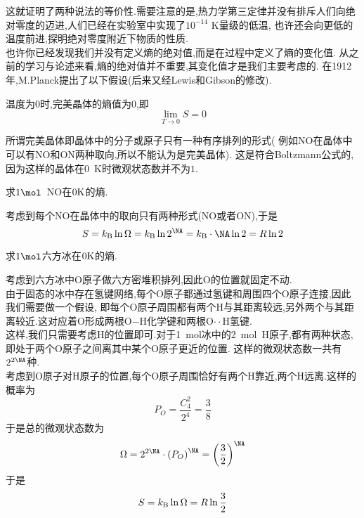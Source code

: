 \documentclass{ctexart}
\begin{document}
这就证明了两种说法的等价性.需要注意的是,热力学第三定律并没有排斥人们向绝对零度的迈进,人们已经在实验室中实现了$10^{-14}\text{ K}$量级的低温,%
也许还会向更低的温度前进,探明绝对零度附近下物质的性质.\vspace{12pt}\\
\indent 也许你已经发现我们并没有定义熵的绝对值,而是在过程中定义了熵的变化值.%
从之前的学习与论述来看,熵的绝对值并不重要,其变化值才是我们主要考虑的.%
在1912年,M.Planck提出了以下假设(后来又经Lewis和Gibson的修改).
\begin{theorem}[3D.3.1 完美晶体的熵]
    温度为$0$时,完美晶体的熵值为$0$,即
    \[\lim_{T\to0}S=0\]

\end{theorem}
所谓完美晶体即晶体中的分子或原子只有一种有序排列的形式(%
例如NO在晶体中可以有NO和ON两种取向,所以不能认为是完美晶体).%
这是符合Boltzmann公式的,因为这样的晶体在$0$\ K时微观状态数并不为$1$.
\begin{exercise}[E.3D.1]
    求$1\mol$\ NO在$0\text K$的熵.
\end{exercise}
\begin{solution}
    考虑到每个NO在晶体中的取向只有两种形式(NO或者ON),于是
    \[S=k_\text B\ln\Omega=k_\text B\ln 2^{\NA}=k_\text B\cdot\NA\ln2=R\ln2\]

\end{solution}
\begin{exercise}[E.3D.2]
    求$1\mol$六方冰\footnotemark 在$0\text K$的熵.
\end{exercise}
\begin{solution}
    考虑到六方冰中O原子做六方密堆积排列,因此O的位置就固定不动.\\
    由于固态的冰中存在氢键网络,每个O原子都通过氢键和周围四个O原子连接,因此我们需要做一个假设,%
    即每个O原子周围都有两个H与其距离较远,另外两个与其距离较近.这对应着O形成两根O$-$H化学键和两根O$\cdot\cdot$H氢键.\\
    这样,我们只需要考虑H的位置即可.对于1\ mol冰中的2\ mol\ H原子,都有两种状态,即处于两个O原子之间离其中某个O原子更近的位置.%
    这样的微观状态数一共有$2^{2\NA}$种.\\
    考虑到O原子对H原子的位置,每个O原子周围恰好有两个H靠近,两个H远离.这样的概率为
    \[P_O=\dfrac{C_4^2}{2^4}=\dfrac{3}{8}\]
    于是总的微观状态数为
    \[\Omega=2^{2\NA}\cdot\left(P_O\right)^{\NA}=\left(\dfrac32\right)^{\NA}\]
    于是
    \[S=k_\text B\ln\Omega=R\ln\dfrac32\]

\end{solution}
\end{document}
